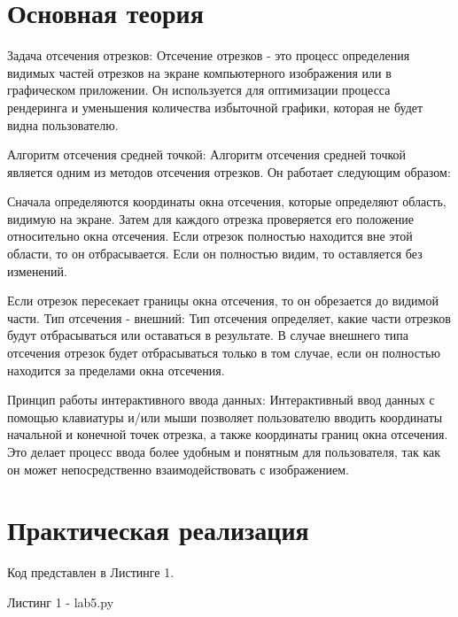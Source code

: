 \documentclass[a4paper, 14pt]{extarticle}
\begin{document}
\section{Основная теория}
\par
Задача отсечения отрезков: Отсечение отрезков - это процесс определения видимых частей отрезков на экране компьютерного изображения или в графическом приложении. Он используется для оптимизации процесса рендеринга и уменьшения количества избыточной графики, которая не будет видна пользователю.
\par
Алгоритм отсечения средней точкой: Алгоритм отсечения средней точкой является одним из методов отсечения отрезков. Он работает следующим образом:
\par
Сначала определяются координаты окна отсечения, которые определяют область, видимую на экране.
Затем для каждого отрезка проверяется его положение относительно окна отсечения. Если отрезок полностью находится вне этой области, то он отбрасывается. Если он полностью видим, то оставляется без изменений.
\par
Если отрезок пересекает границы окна отсечения, то он обрезается до видимой части.
Тип отсечения - внешний: Тип отсечения определяет, какие части отрезков будут отбрасываться или оставаться в результате. В случае внешнего типа отсечения отрезок будет отбрасываться только в том случае, если он полностью находится за пределами окна отсечения.
\par
Принцип работы интерактивного ввода данных: Интерактивный ввод данных с помощью клавиатуры и/или мыши позволяет пользователю вводить координаты начальной и конечной точек отрезка, а также координаты границ окна отсечения. Это делает процесс ввода более удобным и понятным для пользователя, так как он может непосредственно взаимодействовать с изображением.


\pagebreak
\section{Практическая реализация}
Код представлен в Листинге 1.
\par
\begin{center}
    Листинг 1 - lab5.py
\end{center}
\end{document}
